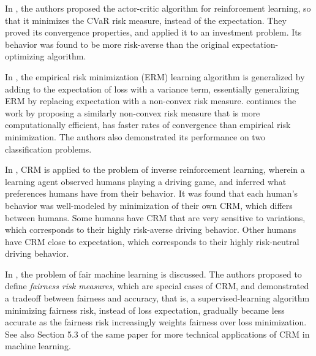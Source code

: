In \cite{chowAlgorithmsCVaROptimization2014}, the authors proposed the actor-critic algorithm for reinforcement learning, so that it minimizes the CVaR risk measure, instead of the expectation. They proved its convergence properties, and applied it to an investment problem. Its behavior was found to be more risk-averse than the original expectation-optimizing algorithm.

In \cite{maurerEmpiricalBernsteinBounds2009}, the empirical risk minimization (ERM) learning algorithm is generalized by adding to the expectation of loss with a variance term, essentially generalizing ERM by replacing expectation with a non-convex risk measure. \cite{namkoongVariancebasedRegularizationConvex2017a} continues the work by proposing a similarly non-convex risk measure that is more computationally efficient, has faster rates of convergence than empirical risk minimization. The authors also demonstrated its performance on two classification problems.

In \cite{majumdarRisksensitiveInverseReinforcement2017}, CRM is applied to the problem of inverse reinforcement learning, wherein a learning agent observed humans playing a driving game, and inferred what preferences humans have from their behavior. It was found that each human's behavior was well-modeled by minimization of their own CRM, which differs between humans. Some humans have CRM that are very sensitive to variations, which corresponds to their highly risk-averse driving behavior. Other humans have CRM close to expectation, which corresponds to their highly risk-neutral driving behavior.

In \cite{williamsonFairnessRiskMeasures2019a}, the problem of fair machine learning is discussed. The authors proposed to define \textit{fairness risk measures}, which are special cases of CRM, and demonstrated a tradeoff between fairness and accuracy, that is, a supervised-learning algorithm minimizing fairness risk, instead of loss expectation, gradually became less accurate as the fairness risk increasingly weights fairness over loss minimization. See also Section 5.3 of the same paper for more technical applications of CRM in machine learning.

